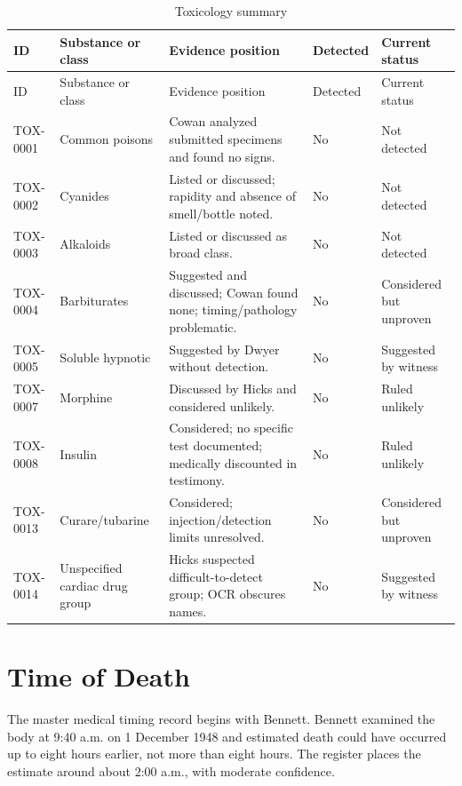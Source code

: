 \begingroup
\scriptsize
\setlength{\tabcolsep}{2pt}
\renewcommand{\arraystretch}{1.12}
\begin{longtable}{>{\raggedright\arraybackslash}p{}>{\raggedright\arraybackslash}p{}>{\raggedright\arraybackslash}p{}>{\raggedright\arraybackslash}p{}>{\raggedright\arraybackslash}p{}}
\caption{Toxicology summary}\label{tab:chapter9-toxicology-summary}\\
\toprule
ID & Substance or class & Evidence position & Detected & Current status \\
\midrule
\endfirsthead
\toprule
ID & Substance or class & Evidence position & Detected & Current status \\
\midrule
\endhead
TOX-0001 & Common poisons & Cowan analyzed submitted specimens and found no signs. & No & Not detected \\
TOX-0002 & Cyanides & Listed or discussed; rapidity and absence of smell/bottle noted. & No & Not detected \\
TOX-0003 & Alkaloids & Listed or discussed as broad class. & No & Not detected \\
TOX-0004 & Barbiturates & Suggested and discussed; Cowan found none; timing/pathology problematic. & No & Considered but unproven \\
TOX-0005 & Soluble hypnotic & Suggested by Dwyer without detection. & No & Suggested by witness \\
TOX-0007 & Morphine & Discussed by Hicks and considered unlikely. & No & Ruled unlikely \\
TOX-0008 & Insulin & Considered; no specific test documented; medically discounted in testimony. & No & Ruled unlikely \\
TOX-0013 & Curare/tubarine & Considered; injection/detection limits unresolved. & No & Considered but unproven \\
TOX-0014 & Unspecified cardiac drug group & Hicks suspected difficult-to-detect group; OCR obscures names. & No & Suggested by witness \\
\bottomrule
\end{longtable}
\endgroup

\section{Time of Death}

The master medical timing record begins with Bennett. Bennett examined the body at 9:40 a.m. on 1 December 1948 and estimated death could have occurred up to eight hours earlier, not more than eight hours. The register places the estimate around about 2:00 a.m., with moderate confidence.

